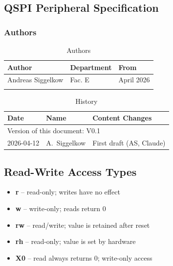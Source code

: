 
\subsection{QSPI Peripheral Specification}

\subsubsection{Authors}
\begin{table}[H]
\caption{Authors}
\label{tab:asqspispec_auth}
\centering
\begin{tabularx}{\textwidth}{|X |X |X |}
  \hline
  Author & Department & From \\
  \hline\hline
  Andreas Siggelkow & Fac. E & April 2026 \\
  \hline
  && \\
  \hline
\end{tabularx}
\end{table}

\begin{table}[H]
\caption{History}
\label{tab:asqspispec_hist}
\centering
\begin{tabularx}{\textwidth}{|X |X |X |}
  \hline
  Date & Name & Content Changes \\
  \hline
  \multicolumn{3}{|l|}{Version of this document: V0.1} \\
  \hline
  2026-04-12 & A.~Siggelkow & First draft (AS, Claude) \\
  \hline
\end{tabularx}
\end{table}

\subsection{Read-Write Access Types}
\begin{itemize}
  \item \textbf{r}  -- read-only; writes have no effect
  \item \textbf{w}  -- write-only; reads return 0
  \item \textbf{rw} -- read/write; value is retained after reset
  \item \textbf{rh} -- read-only; value is set by hardware
  \item \textbf{X0} -- read always returns 0; write-only access
\end{itemize}


